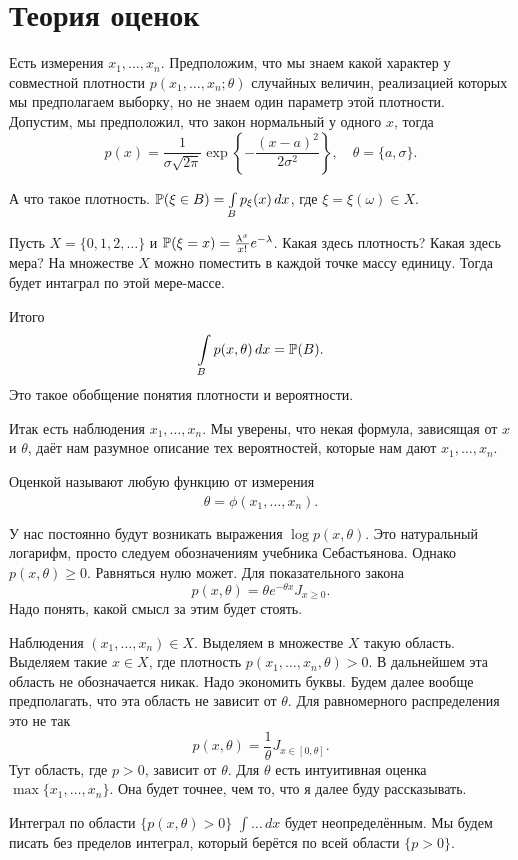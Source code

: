 \section{Теория оценок}

 Есть измерения $x_1,\dots,x_n$. Предположим, что мы знаем какой характер у совместной плотности $p(x_1,\dots,x_n;\theta)$ случайных величин, реализацией которых мы предполагаем выборку, но не знаем один параметр этой плотности. Допустим, мы предположил, что закон нормальный у одного $x$, тогда
\[
  p(x) = \frac1{\sigma\sqrt{2\pi}} \exp\left\{ -\frac{(x-a)^2}{2\sigma^2} \right\},\quad \theta = \{a,\sigma\}.
\]

А что такое плотность. $\P(\xi\in B) = \int\limits_B p_\xi(x)\,dx$, где $\xi = \xi(\omega)\in X$.

Пусть $X=\{0,1,2,\dots\}$ и  $\P(\xi=x) = \frac{\lambda^x}{x!}e^{-\lambda}$. Какая здесь плотность? Какая здесь мера? На множестве $X$ можно поместить в каждой точке массу единицу. Тогда будет интаграл по этой мере-массе.

Итого
\[
  \int\limits_B p(x,\theta)\,dx=\P(B).
\]
Это такое обобщение понятия плотности и вероятности.

Итак есть наблюдения $x_1,\dots,x_n$. Мы уверены, что некая формула, зависящая от $x$ и $\theta$, даёт нам разумное описание тех вероятностей, которые нам дают $x_1,\dots,x_n$.

Оценкой называют любую функцию от измерения
\[
  \hat\theta = \phi(x_1,\dots,x_n).
\]

У нас постоянно будут возникать выражения $\log p(x,\theta)$. Это натуральный логарифм, просто следуем обозначениям учебника Себастьянова. Однако $p(x,\theta)\ge 0$. Равняться нулю может.  Для показательного закона
\[
  p(x,\theta) = \theta e^{-\theta x} J_{x\ge 0}.
\]
Надо понять, какой смысл за этим будет стоять.

Наблюдения $(x_1,\dots,x_n)\in X$. Выделяем в множестве $X$ такую область. Выделяем такие $x\in X$, где плотность $p(x_1,\dots,x_n,\theta)>0$. В дальнейшем эта область не обозначается никак. Надо экономить буквы. Будем далее вообще предполагать, что эта область не зависит от $\theta$. Для равномерного распределения это не так
\[
  p(x,\theta) = \frac1\theta J_{x\in[0,\theta]}.
\]
Тут область, где $p>0$, зависит от $\theta$.  Для $\theta$ есть интуитивная оценка $\max\{x_1,\dots,x_n\}$. Она будет точнее, чем то, что я далее буду рассказывать.

Интеграл по области $\{p(x,\theta)>0\}$ $\int\dots\,dx$ будет неопределённым. Мы будем писать без пределов интеграл, который берётся по всей области $\{p>0\}$.


